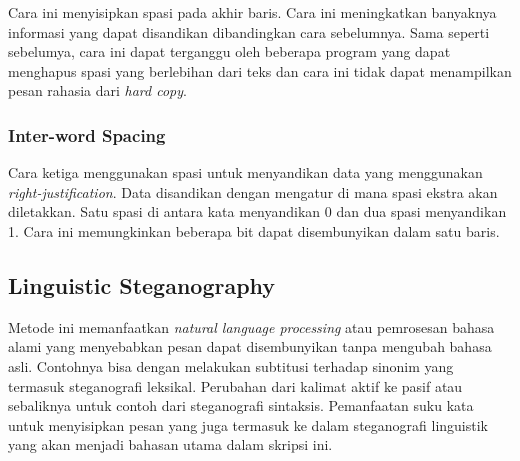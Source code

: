 Cara ini menyisipkan spasi pada akhir baris. Cara ini meningkatkan banyaknya informasi yang dapat disandikan dibandingkan cara sebelumnya. Sama seperti sebelumya, cara ini dapat terganggu oleh beberapa program yang dapat menghapus spasi yang berlebihan dari teks dan cara ini tidak dapat menampilkan pesan rahasia dari \textit{hard copy}.

\subsubsection{Inter-word Spacing}

Cara ketiga menggunakan spasi untuk menyandikan data yang menggunakan \textit{right-justification}. Data disandikan dengan mengatur di mana spasi ekstra akan diletakkan. Satu spasi di antara kata menyandikan 0 dan dua spasi menyandikan 1. Cara ini memungkinkan beberapa bit dapat disembunyikan dalam satu baris.

\subsection{Linguistic Steganography}
Metode ini memanfaatkan \textit{natural language processing} atau pemrosesan bahasa alami yang menyebabkan pesan dapat disembunyikan tanpa mengubah bahasa asli. Contohnya bisa dengan melakukan subtitusi terhadap sinonim yang termasuk steganografi leksikal. Perubahan dari kalimat aktif ke pasif atau sebaliknya untuk contoh dari steganografi sintaksis. Pemanfaatan suku kata untuk menyisipkan pesan yang juga termasuk ke dalam steganografi linguistik yang akan menjadi bahasan utama dalam skripsi ini.